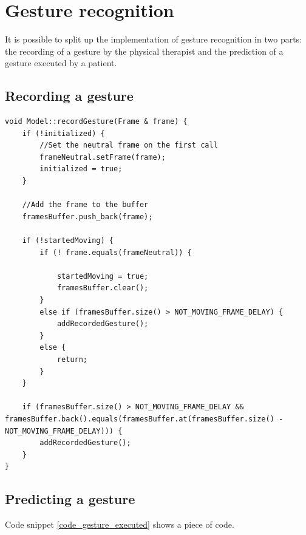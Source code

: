 \section{Gesture recognition}

It is possible to split up the implementation of gesture recognition in two parts: the recording of a gesture by the physical therapist and the prediction of a gesture executed by a patient.


\subsection{Recording a gesture}

\begin{lstlisting}[caption=method to record a gesture, label=code_record_gesture]
void Model::recordGesture(Frame & frame) {
	if (!initialized) {
		//Set the neutral frame on the first call
		frameNeutral.setFrame(frame);
		initialized = true;
	}
	
	//Add the frame to the buffer
	framesBuffer.push_back(frame);

	if (!startedMoving) {
		if (! frame.equals(frameNeutral)) {
		
			startedMoving = true;
			framesBuffer.clear();
		}
		else if (framesBuffer.size() > NOT_MOVING_FRAME_DELAY) {
			addRecordedGesture();
		}
		else {
			return;
		}
	}

	if (framesBuffer.size() > NOT_MOVING_FRAME_DELAY &&	framesBuffer.back().equals(framesBuffer.at(framesBuffer.size() - NOT_MOVING_FRAME_DELAY))) {
		addRecordedGesture();
	}
}
\end{lstlisting}


\subsection{Predicting a gesture}

Code snippet \ref{code_gesture_executed} shows a piece of code.

